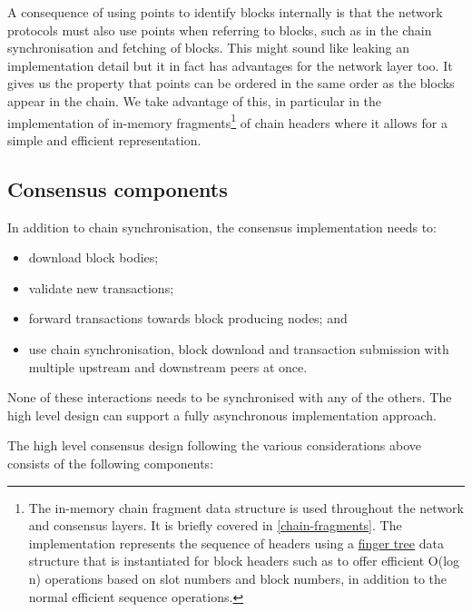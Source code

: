 \documentclass[11pt,a4paper]{article}
\begin{document}
A consequence of using points to identify blocks internally is that the
network protocols must also use points when referring to blocks, such as
in the chain synchronisation and fetching of blocks. This might sound
like leaking an implementation detail but it in fact has advantages for
the network layer too. It gives us the property that points can be
ordered in the same order as the blocks appear in the chain. We take
advantage of this, in particular in the implementation of in-memory
fragments\footnote{The in-memory chain fragment data structure is used
  throughout the network and consensus layers. It is briefly covered in
  \cref{chain-fragments}. The
  implementation represents the sequence of headers using a
  \href{http://www.staff.city.ac.uk/~ross/papers/FingerTree.html}{{finger
  tree}} data structure that is instantiated for block headers such as
  to offer efficient O(log n) operations based on slot numbers and block
  numbers, in addition to the normal efficient sequence operations.} of
chain headers where it allows for a simple and efficient representation.

\subsection{Consensus components}
\label{consensus-components}

In addition to chain synchronisation, the consensus implementation needs
to:

\begin{itemize}
\item
  download block bodies;
\item
  validate new transactions;
\item
  forward transactions towards block producing nodes; and
\item
  use chain synchronisation, block download and transaction submission
  with multiple upstream and downstream peers at once.
\end{itemize}

None of these interactions needs to be synchronised with any of the
others. The high level design can support a fully asynchronous
implementation approach.

The high level consensus design following the various considerations
above consists of the following components:
\end{document}
